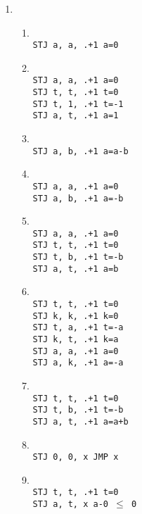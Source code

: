 \documentclass[a4paper,11pt]{article}             %
\begin{document}

\begin{enumerate}
\item
\begin{enumerate}

\item \texttt{\\
STJ a, a, .+1 \quad a=0
}

\item \texttt{\\
STJ a, a, .+1 \quad a=0\\
STJ t, t, .+1 \quad t=0\\
STJ t, 1, .+1 \quad t=-1\\
STJ a, t, .+1 \quad a=1
}

\item \texttt{\\
STJ a, b, .+1 \quad a=a-b
}

\item \texttt{\\
STJ a, a, .+1 \quad a=0\\
STJ a, b, .+1 \quad a=-b\\
}

\item \texttt{\\
STJ a, a, .+1 \quad a=0\\
STJ t, t, .+1 \quad t=0\\
STJ t, b, .+1 \quad t=-b\\
STJ a, t, .+1 \quad a=b
}

\item \texttt{\\
STJ t, t, .+1 \quad t=0\\
STJ k, k, .+1 \quad k=0\\
STJ t, a, .+1 \quad t=-a\\
STJ k, t, .+1 \quad k=a\\
STJ a, a, .+1 \quad a=0\\
STJ a, k, .+1 \quad a=-a
}

\item \texttt{\\
STJ t, t, .+1 \quad t=0\\
STJ t, b, .+1 \quad t=-b\\
STJ a, t, .+1 \quad a=a+b
}

\item \texttt{\\
STJ 0, 0, x \quad JMP x
}

\item \texttt{\\
STJ t, t, .+1 \quad t=0\\
STJ a, t, x \quad a-0 $\leq$ 0
}


\end{enumerate}
\end{enumerate}
\end{document}
